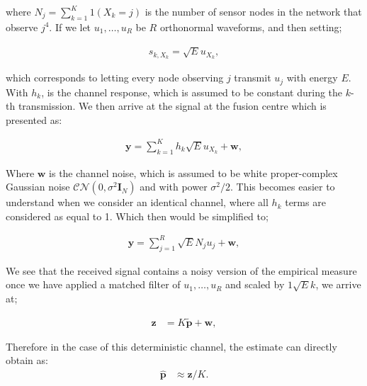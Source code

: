 \documentclass{article}
\begin{document}
where $N_j =\sum_{k=1}^K 1(X_k = j)$ is the number of sensor nodes in the network that observe $j^4$. If we let $u_1,\dots,u_R$ be $R$ orthonormal waveforms, and then setting;

\begin{align}
    s_{k,X_k} = \sqrt{E}u_{X_k}, 
\end{align}

which corresponds to letting every node observing $j$ transmit $u_j$ with energy $E$. With $h_k$, is the channel response, which is assumed to be constant during the $k$-th transmission.  We then arrive at the signal at the fusion centre which is presented as:

\begin{align}
    \boldsymbol{y} = \sum_{k=1}^K h_k  \sqrt{E}u_{X_k} + \boldsymbol{w}, \label{eq:system_model}
\end{align}

Where $\boldsymbol{w}$ is the channel noise, which is assumed to be white proper-complex Gaussian noise $\mathcal{CN}(0, \sigma^2 \boldsymbol{I}_N)$ and with power $\sigma^2/2$.  This becomes easier to understand when we consider an identical channel, where all $h_k$ terms are considered as equal to 1. Which then would be simplified to;

\begin{align}
    \boldsymbol{y} = \sum_{j=1}^R \sqrt{E}N_j u_{j} + \boldsymbol{w}, \label{eq:simplified_system_model}
\end{align}


We see that the received signal contains a noisy version of the empirical measure once we have applied a matched filter of $u_1,\dots,u_R$ and scaled by $1\sqrt{E}k$, we arrive at;

%
\begin{align}
    \boldsymbol{z} &= K \tilde{\boldsymbol{p}} + \boldsymbol{w}, 
    \label{simple_estimation_indentical}
\end{align}

Therefore in the case of this deterministic channel, the estimate can directly obtain as:
%
\begin{align}
    \boldsymbol{\hat{p}} &\approx \boldsymbol{z} / K. \label{eq:est_const_sys}
\end{align}
\end{document}
